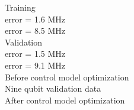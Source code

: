 \documentclass{article}
\begin{document}
Training\\
error = 1.6 MHz\\
error = 8.5 MHz\\
Validation\\
error = 1.5 MHz\\
error = 9.1 MHz\\
Before control model optimization\\
Nine qubit validation data\\
After control model optimization\\
\end{document}
